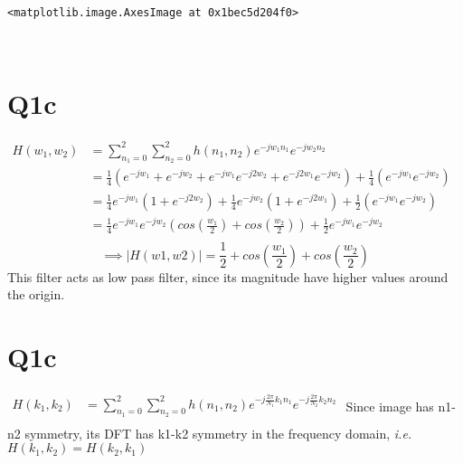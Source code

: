 \documentclass[11pt]{article}
\makeatletter
\newcommand{\boxspacing}{\kern\kvtcb@left@rule\kern\kvtcb@boxsep}
\newcommand{\prompt}[4]{
        {\ttfamily\llap{{\color{#2}[#3]:\hspace{3pt}#4}}\vspace{-\baselineskip}}
    }
\makeatother
\begin{document}
            \begin{tcolorbox}[breakable, size=fbox, boxrule=.5pt, pad at break*=1mm, opacityfill=0]
\prompt{Out}{outcolor}{5}{\boxspacing}
\begin{Verbatim}[commandchars=\\\{\}]
<matplotlib.image.AxesImage at 0x1bec5d204f0>
\end{Verbatim}
\end{tcolorbox}
        
    \begin{center}
    \end{center}
    { \hspace*{\fill} \\}
    
    \hypertarget{q1c}{%
\section{Q1c}\label{q1c}}

\(\begin{align} H(w_1,w_2) &= \sum\limits_{n_1=0}^2\sum\limits_{n_2=0}^2 h(n_1,n_2) e^{-jw_1n_1} e^{-jw_2n_2} \\  &= \frac{1}{4}(e^{-jw_1}+e^{-jw_2}+e^{-jw_1}e^{-j2w_2}+e^{-j2w_1}e^{-jw_2}) + \frac{1}{4}(e^{-jw_1}e^{-jw_2}) \nonumber\\  &= \frac{1}{4}e^{-jw_1}(1+e^{-j2w_2}) + \frac{1}{4}e^{-jw_2}(1+e^{-j2w_1}) + \frac{1}{2}(e^{-jw_1}e^{-jw_2}) \nonumber\\  &= \frac{1}{4}e^{-jw_1}e^{-jw_2}(cos(\frac{w_1}{2})+cos(\frac{w_2}{2})) + \frac{1}{2} e^{-jw_1}e^{-jw_2} \nonumber\\ \end{align}\)
\[\implies |H(w1,w2)| = \frac{1}{2} + cos(\frac{w_1}{2})+cos(\frac{w_2}{2})\]
This filter acts as low pass filter, since its magnitude have higher
values around the origin.

    \hypertarget{q1c}{%
\section{Q1c}\label{q1c}}

\(\begin{align} H(k_1,k_2) &= \sum\limits_{n_1=0}^2\sum\limits_{n_2=0}^2 h(n_1,n_2) e^{-j{\frac{2\pi}{N_1}}k_1n_1} e^{-j{\frac{2\pi}{N_2}}k_2n_2} \\ \end{align}\)
Since image has n1-n2 symmetry, its DFT has k1-k2 symmetry in the
frequency domain, \emph{i.e.} \(H(k_1,k_2) = H(k_2,k_1)\)
\end{document}
